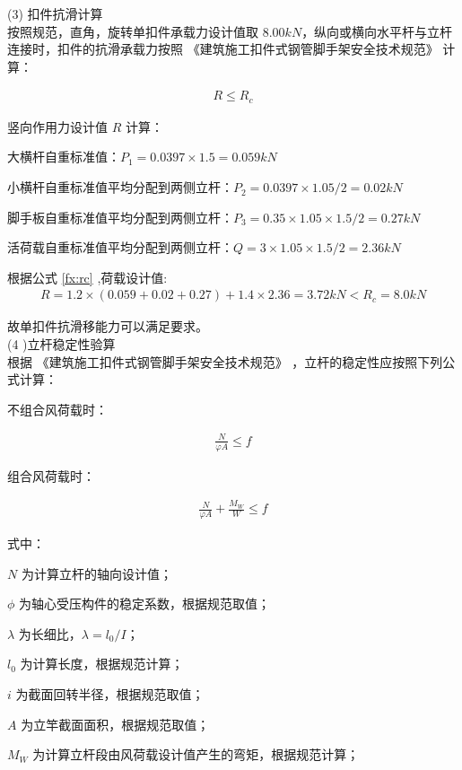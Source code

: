 (3) 扣件抗滑计算\\

按照规范，直角，旋转单扣件承载力设计值取 $8.00kN$，纵向或横向水平杆与立杆连接时，扣件的抗滑承载力按照 《建筑施工扣件式钢管脚手架安全技术规范》 计算：

\begin{align}
    \label{fx:rc}
    R \leq R_c
\end{align}

竖向作用力设计值 $R$ 计算：

 大横杆自重标准值：$P_1=0.0397×1.5=0.059kN$

 小横杆自重标准值平均分配到两侧立杆：$P_2=0.0397×1.05/2=0.02kN$ 

 脚手板自重标准值平均分配到两侧立杆：$P_3=0.35×1.05×1.5/2=0.27kN$ 

 活荷载自重标准值平均分配到两侧立杆：$Q=3×1.05×1.5/2=2.36kN$

根据公式 \ref{fx:rc} ,荷载设计值:
\begin{align}
R=1.2×(0.059+0.02+0.27)+1.4×2.36=3.72kN<R_c=8.0kN
\end{align}

故单扣件抗滑移能力可以满足要求。\\

(4 )立杆稳定性验算\\

根据 《建筑施工扣件式钢管脚手架安全技术规范》 ，立杆的稳定性应按照下列公式计算：

不组合风荷载时：

\begin{align}
    \label{fx:nw}
    \frac{N}{\varphi A}\leq f
\end{align}

组合风荷载时：

\begin{align}
    \label{fx:w}
    \frac{N}{\varphi A}+ \frac{M_W}{W}\leq f
\end{align}

式中：

$N$ 为计算立杆的轴向设计值；

$\phi$ 为轴心受压构件的稳定系数，根据规范取值；

$\lambda$ 为长细比，$\lambda =l_0/I$；

$l_0$ 为计算长度，根据规范计算；

$i$ 为截面回转半径，根据规范取值；

$A$ 为立竿截面面积，根据规范取值；

$M_W$ 为计算立杆段由风荷载设计值产生的弯矩，根据规范计算；

